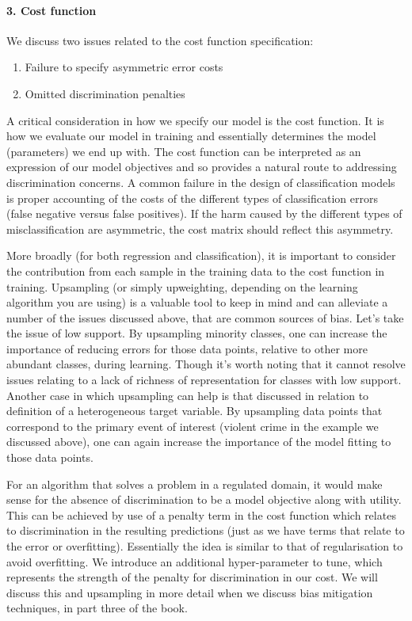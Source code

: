 \paragraph*{3. Cost function}

We discuss two issues related to the cost function specification:
%
\begin{enumerate}
\item Failure to specify asymmetric error costs
\item Omitted discrimination penalties
\end{enumerate}

A critical consideration in how we specify our model is the cost function.  It is how we evaluate our model in training and essentially determines the model (parameters) we end up with. The cost function can be interpreted as an expression of our model objectives and so provides a natural route to addressing discrimination concerns. A common failure in the design of classification models is proper accounting of the costs of the different types of classification errors (false negative versus false positives). If the harm caused by the different types of misclassification are asymmetric, the cost matrix should reflect this asymmetry.

More broadly (for both regression and classification), it is important to consider the contribution from each sample in the training data to the cost function in training. Upsampling (or simply upweighting, depending on the learning algorithm you are using) is a valuable tool to keep in mind and can alleviate a number of the issues discussed above, that are common sources of bias. Let's take the issue of low support. By upsampling minority classes, one can increase the importance of reducing errors for those data points, relative to other more abundant classes, during learning. Though it's worth noting that it cannot resolve issues relating to a lack of richness of representation for classes with low support. Another case in which upsampling can help is that discussed in relation to definition of a heterogeneous target variable. By upsampling data points that correspond to the primary event of interest (violent crime in the example we discussed above), one can again increase the importance of the model fitting to those data points.

For an algorithm that solves a problem in a regulated domain, it would make sense for the absence of discrimination to be a model objective along with utility. This can be achieved by use of a penalty term in the cost function which relates to discrimination in the resulting predictions (just as we have terms that relate to the error or overfitting). Essentially the idea is similar to that of regularisation to avoid overfitting. We introduce an additional hyper-parameter to tune, which represents the strength of the penalty for discrimination in our cost. We will discuss this and upsampling in more detail when we discuss bias mitigation techniques, in part three of the book.

